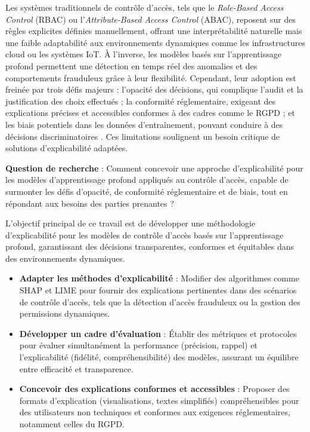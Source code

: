 Les systèmes traditionnels de contrôle d'accès, tels que le \textit{Role-Based Access Control} (RBAC) ou l'\textit{Attribute-Based Access Control} (ABAC), reposent sur des règles explicites définies manuellement, offrant une interprétabilité naturelle mais une faible adaptabilité aux environnements dynamiques comme les infrastructures cloud ou les systèmes IoT. À l'inverse, les modèles basés sur l'apprentissage profond permettent une détection en temps réel des anomalies et des comportements frauduleux grâce à leur flexibilité. Cependant, leur adoption est freinée par trois défis majeurs : l'opacité des décisions, qui complique l'audit et la justification des choix effectués \cite{rudin2019stop} ; la conformité réglementaire, exigeant des explications précises et accessibles conformes à des cadres comme le RGPD \cite{goodman2017gdpr} ; et les biais potentiels dans les données d'entraînement, pouvant conduire à des décisions discriminatoires \cite{slack2020fooling}. Ces limitations soulignent un besoin critique de solutions d'explicabilité adaptées.

\textbf{Question de recherche} : Comment concevoir une approche d'explicabilité pour les modèles d'apprentissage profond appliqués au contrôle d'accès, capable de surmonter les défis d'opacité, de conformité réglementaire et de biais, tout en répondant aux besoins des parties prenantes ?

L'objectif principal de ce travail est de développer une méthodologie d'explicabilité pour les modèles de contrôle d'accès basés sur l'apprentissage profond, garantissant des décisions transparentes, conformes et équitables dans des environnements dynamiques.

\begin{itemize}
    \item \textbf{Adapter les méthodes d'explicabilité} : Modifier des algorithmes comme SHAP et LIME pour fournir des explications pertinentes dans des scénarios de contrôle d'accès, tels que la détection d'accès frauduleux ou la gestion des permissions dynamiques.
    \item \textbf{Développer un cadre d'évaluation} : Établir des métriques et protocoles pour évaluer simultanément la performance (précision, rappel) et l'explicabilité (fidélité, compréhensibilité) des modèles, assurant un équilibre entre efficacité et transparence.
    \item \textbf{Concevoir des explications conformes et accessibles} : Proposer des formats d'explication (visualisations, textes simplifiés) compréhensibles pour des utilisateurs non techniques et conformes aux exigences réglementaires, notamment celles du RGPD.
\end{itemize}


